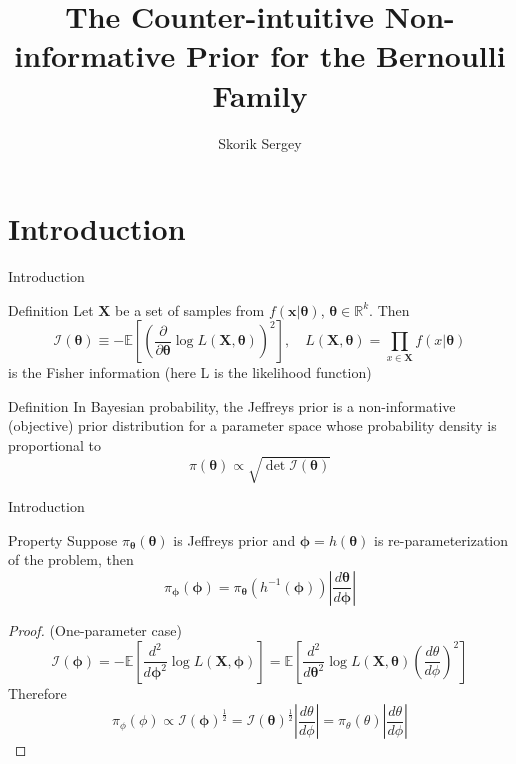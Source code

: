 \documentclass{beamer}
\title{The Counter-intuitive Non-informative Prior for the Bernoulli Family}
\author{Skorik Sergey}
\institute{MIPT, 2022}
\begin{document}
\begin{frame}
    \titlepage
\end{frame}


\begin{frame}
    \tableofcontents
\end{frame}


\section{Introduction}

\begin{frame}{Introduction}
    \begin{block}{Definition}
    Let $\mathbf{X}$ be a set of samples from
    $f(\mathbf{x}|\boldsymbol{\theta})$, $\boldsymbol{\theta} \in \mathbb{R}^k$. Then
    \[
        \mathcal{I}(\boldsymbol{\theta}) \equiv - \mathbb{E}\left[\left(\dfrac{\partial}{\partial \boldsymbol{\theta}}\log L(\mathbf{X}, \boldsymbol{\theta})\right)^2\right], \quad L(\mathbf{X}, \boldsymbol{\theta}) = \prod_{x \in \mathbf{X}}f(x|\boldsymbol{\theta})
    \]
    is the Fisher information (here L is the likelihood function)
    \end{block}
    
    \begin{block}{Definition}
    In Bayesian probability, the Jeffreys prior is a non-informative (objective) prior distribution for a parameter space whose probability density is proportional to
    \[\pi(\boldsymbol{\theta}) \propto \sqrt{\det \mathcal{I}(\boldsymbol{\theta})}\]
    \end{block}

\end{frame}

\begin{frame}{Introduction}
    \begin{block}{Property}
        Suppose $\pi_{\boldsymbol{\theta}}(\boldsymbol{\theta})$ is Jeffreys prior and $\boldsymbol{\phi} = h(\boldsymbol{\theta})$ is re-parameterization of the problem, then
        \[\pi_{\boldsymbol{\phi}}(\boldsymbol{\phi}) = \pi_{\boldsymbol{\theta}}(h^{-1}(\boldsymbol{\phi}))\left|\dfrac{d\boldsymbol{\theta}}{d\boldsymbol{\phi}}\right|\]
    \end{block}
    \begin{proof} (One-parameter case)
        \[\mathcal{I}(\mathbf{\phi}) = - \mathbb{E}\left[\dfrac{d^2}{d \mathbf{\phi}^2}\log L(\mathbf{X}, \mathbf{\phi})\right] = \mathbb{E}\left[\dfrac{d^2}{d \mathbf{\theta}^2}\log L(\mathbf{X}, \mathbf{\theta})\left(\dfrac{d\theta}{d\phi}\right)^2\right]\]
        Therefore
        \[\pi_{\phi}(\phi) \propto \mathcal{I}(\mathbf{\phi})^{\frac{1}{2}} = \mathcal{I}(\mathbf{\theta})^{\frac{1}{2}} \left|\dfrac{d\theta}{d\phi}\right| = \pi_{\theta}(\theta) \left|\dfrac{d\theta}{d\phi}\right|\]
    \end{proof}

\end{frame}
\end{document}
